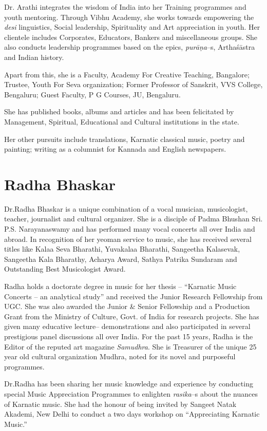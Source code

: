 Dr. Arathi integrates the wisdom of India into her Training programmes and youth mentoring. Through Vibhu Academy, she works towards empowering the \textit{desi} linguistics, Social leadership, Spirituality and Art appreciation in youth. Her clientele includes Corporates, Educators, Bankers and miscellaneous groups. She also conducts leadership programmes based on the epics, \textit{purāṇa}–s, Arthaśāstra and Indian history.

Apart from this, she is a Faculty, Academy For Creative Teaching, Bangalore; Trustee, Youth For Seva organization; Former Professor of Sanskrit, VVS College, Bengaluru; Guest Faculty, P G Courses, JU, Bengaluru.

She has published books, albums and articles and has been felicitated by Management, Spiritual, Educational and Cultural institutions in the state.

Her other pursuits include translations, Karnatic classical music, poetry and painting; writing as a columnist for Kannada and English newspapers.


\section*{Radha Bhaskar}

Dr.Radha Bhaskar is a unique combination of a vocal musician, musicologist, teacher, journalist and cultural organizer. She is a disciple of Padma Bhushan Sri. P.S. Narayanaswamy and has performed many vocal concerts all over India and abroad. In recognition of her yeoman service to music, she has received several titles like Kalaa Seva Bharathi, Yuvakalaa Bharathi, Sangeetha Kalasevak, Sangeetha Kala Bharathy, Acharya Award, Sathya Patrika Sundaram and Outstanding Best Musicologist Award.

Radha holds a doctorate degree in music for her thesis – “Karnatic Music Concerts – an analytical study” and received the Junior Research Fellowship from UGC. She was also awarded the Junior \& Senior Fellowship and a Production Grant from the Ministry of Culture, Govt. of India for research projects. She has given many educative lecture– demonstrations and also participated in several prestigious panel discussions all over India. For the past 15 years, Radha is the Editor of the reputed art magazine \textit{Samudhra}. She is Treasurer of the unique 25 year old cultural organization Mudhra, noted for its novel and purposeful programmes.

Dr.Radha has been sharing her music knowledge and experience by conducting special Music Appreciation Programmes to enlighten \textit{rasika}–s about the nuances of Karnatic music. She had the honour of being invited by Sangeet Natak Akademi, New Delhi to conduct a two days workshop on “Appreciating Karnatic Music.”

